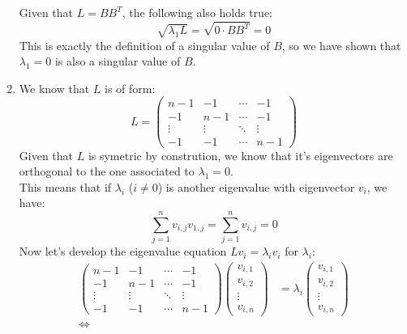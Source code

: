 \documentclass[11pt, legalpaper]{article}
\begin{document}
\begin{enumerate}
            Given that $L= BB^T$, the following also holds true:
            $$\sqrt{\lambda_1 L}=\sqrt{0 \cdot B B^T}=0$$
            This is exactly the definition of a singular value of $B$, so we have shown that $\lambda_1=0$ is also a singular value of $B$. 
    \item   We know that $L$ is of form:
            $$L=\begin{pmatrix}
                n-1 & -1 & \cdots & -1 \\
                -1 & n-1 & \cdots & -1 \\
                \vdots & \vdots & \ddots & \vdots \\
                -1 & -1 & \cdots & n-1
            \end{pmatrix}$$
            Given that $L$ is symetric by constrution, we know that it's eigenvectors are orthogonal to the one associated to $\lambda_1=0$. \\
            This means that if $\lambda_i$ ($i \ne 0$) is another eigenvalue with eigenvector $v_i$, we have:
            \begin{equation}
                \sum_{j=1}^{n}v_{i,j}v_{1,j}=\sum_{j=1}^{n}v_{i,j}=0
            \end{equation}
            Now let's develop the eigenvalue equation $Lv_i=\lambda_iv_i$ for $\lambda_i$:
            \begin{align*}
                \begin{pmatrix}
                    n-1 & -1 & \cdots & -1 \\
                    -1 & n-1 & \cdots & -1 \\
                    \vdots & \vdots & \ddots & \vdots \\
                    -1 & -1 & \cdots & n-1
                \end{pmatrix}\begin{pmatrix}
                    v_{i,1} \\ v_{i,2} \\ \vdots \\ v_{i,n}
                \end{pmatrix} & =\lambda_i \begin{pmatrix}
                    v_{i,1} \\ v_{i,2} \\ \vdots \\ v_{i,n}
                \end{pmatrix} \\
                \Longleftrightarrow & \\

\end{align*}
\end{enumerate}
\end{document}
